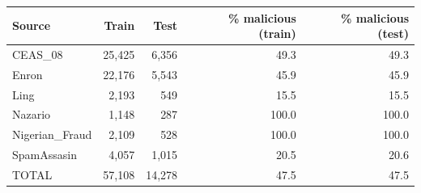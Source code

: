 \begin{tabular}{lrrrr}
\toprule
Source & Train & Test & \% malicious (train) & \% malicious (test) \\
\midrule
CEAS\_08 & 25,425 & 6,356 & 49.3 & 49.3 \\
Enron & 22,176 & 5,543 & 45.9 & 45.9 \\
Ling & 2,193 & 549 & 15.5 & 15.5 \\
Nazario & 1,148 & 287 & 100.0 & 100.0 \\
Nigerian\_Fraud & 2,109 & 528 & 100.0 & 100.0 \\
SpamAssasin & 4,057 & 1,015 & 20.5 & 20.6 \\
\midrule
TOTAL & 57,108 & 14,278 & 47.5 & 47.5 \\
\bottomrule
\end{tabular}